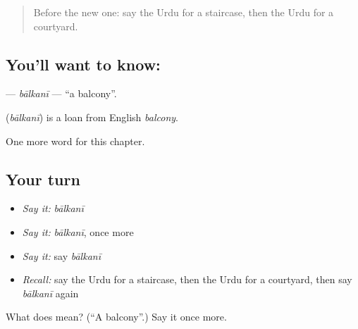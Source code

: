 \label{lesson:UR-C219-balkani}



\begin{quote}
Before the new one: say the Urdu for a staircase, then the Urdu for a courtyard.
\end{quote}

\subsection*{You'll want to know: }
\textbf{} — \emph{bālkanī} — \textquotedblleft{}a balcony\textquotedblright{}.

\begin{cousinweb}
\textbf{} (\emph{bālkanī}) is a loan from English \emph{balcony}.
\end{cousinweb}

\begin{grammarlens}[title={What you've built}]
One more word for this chapter.
\end{grammarlens}

\subsection*{Your turn}
\begin{itemize}
\raggedright
  \item \emph{Say it:} \emph{bālkanī}
  \item \emph{Say it:} \emph{bālkanī}, once more
  \item \emph{Say it:} say \emph{bālkanī}
  \item \emph{Recall:} say the Urdu for a staircase, then the Urdu for a courtyard, then say \emph{bālkanī} again
\end{itemize}

\begin{tcolorbox}[breakable,colback=teal!4,colframe=teal!35!black,title={Before you move on}]
What does  mean? (\textquotedblleft{}A balcony\textquotedblright{}.) Say it once more.
\end{tcolorbox}
